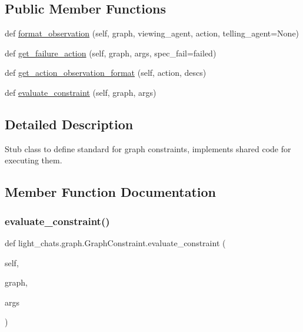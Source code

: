\subsection*{Public Member Functions}
\begin{DoxyCompactItemize}
\item 
def \hyperlink{classlight__chats_1_1graph_1_1GraphConstraint_aa2918a7125065dcd76dd0ee09650fd38}{format\+\_\+observation} (self, graph, viewing\+\_\+agent, action, telling\+\_\+agent=None)
\item 
def \hyperlink{classlight__chats_1_1graph_1_1GraphConstraint_ac824a43559c367bf625f79559f026c6b}{get\+\_\+failure\+\_\+action} (self, graph, args, spec\+\_\+fail=\textquotesingle{}failed\textquotesingle{})
\item 
def \hyperlink{classlight__chats_1_1graph_1_1GraphConstraint_a53754bb6025c16b76718f44dad075733}{get\+\_\+action\+\_\+observation\+\_\+format} (self, action, descs)
\item 
def \hyperlink{classlight__chats_1_1graph_1_1GraphConstraint_ac196aba3dee4fc3bf7284dc764866659}{evaluate\+\_\+constraint} (self, graph, args)
\end{DoxyCompactItemize}


\subsection{Detailed Description}
\begin{DoxyVerb}Stub class to define standard for graph constraints, implements shared code for
executing them.
\end{DoxyVerb}
 

\subsection{Member Function Documentation}
\mbox{\label{classlight__chats_1_1graph_1_1GraphConstraint_ac196aba3dee4fc3bf7284dc764866659}} 
\subsubsection{\texorpdfstring{evaluate\+\_\+constraint()}{evaluate\_constraint()}}
{\footnotesize\ttfamily def light\+\_\+chats.\+graph.\+Graph\+Constraint.\+evaluate\+\_\+constraint (\begin{DoxyParamCaption}\item[{}]{self,  }\item[{}]{graph,  }\item[{}]{args }\end{DoxyParamCaption})}

